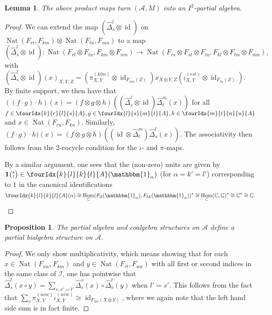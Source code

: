 \documentclass[10pt]{article}
\DeclareMathOperator{\id}{id}
\DeclareMathOperator{\Hom}{Hom}
\DeclareMathOperator{\Nat}{\mathrm{Nat}}
\newcommand{\C}{\mathbb{C}}
\newcommand{\Grt}[3]{#1{\tiny {\begin{pmatrix} #2\\#3\end{pmatrix}}}}
\newcommand{\Unitb}{\mathbbm{1}}
\newcommand{\UnitC}[2]{\Grt{\mathbf{1}}{#1}{#2}}
\newcommand{\Gr}[5]{\fourIdx{#2}{#4}{#3}{#5}{#1}}%
\newtheorem{Lem}[Theorem]{Lemma}
\newtheorem{Prop}[Theorem]{Proposition}
\theoremstyle{definition}
\numberwithin{equation}{section}
\begin{document}
\begin{Lem} The above product maps turn $(\mathscr{A},M)$ into an $I^2$-partial algebra.
\end{Lem}
\begin{proof} We can extend the map $(\hat{\Delta}^l_s\otimes \id)$ on $\Nat(F_{rt},F_{km})\otimes \Nat(F_{tu},F_{mn})$ to a map $(\hat{\Delta}^l_s\otimes \id): \Nat(F_{rt}\otimes F_{tu},F_{km}\otimes F_{mn}) \rightarrow  \Nat(F_{rs}\otimes F_{st}\otimes F_{tu},F_{kl}\otimes F_{lm}\otimes F_{mn}),$ with $(\hat{\Delta}^l_s\otimes \id)(x)_{X,Y,Z} = \left(\pi^{(klm)}_{X,Y}\otimes \id_{F_{mn}(Z)}\right) x_{X\otimes Y, Z} \left(\iota^{(rst)}_{X,Y} \otimes \id_{F_{tu}(Z)}\right).$
By finite support, we then have that $((f\cdot g)\cdot h)(x) = (f\otimes g\otimes h)((\hat{\Delta}^l_s\otimes \id)\hat{\Delta}^m_t(x))$ for all $f\in \Gr{A}{k}{l}{r}{s},g\in \Gr{A}{l}{m}{s}{t},h\in \Gr{A}{m}{n}{t}{u}$ and $x\in  \Nat(F_{ru},F_{kn})$. Similarly, $(f\cdot g)\cdot h)(x) = (f\otimes g\otimes h)((\id\otimes \hat{\Delta}^m_t)\hat{\Delta}^l_s(x)).$ The associativity then follows from the 2-cocycle condition for the $\iota$- and $\pi$-maps. 

By a similar argument, one sees that the (non-zero) units are given by $\UnitC{k}{l}\in \Gr{A}{k}{k}{l}{l}(\Unitb_{\alpha})$  (for $\alpha=k'=l'$) corresponding to $1$ in the canonical identifications  \[\Gr{A}{k}{k}{l}{l}(\alpha) \cong \Hom_{\C}(F_{ll}(\Unitb_{\alpha}),F_{kk}(\Unitb_{\alpha}))^*\cong \Hom_{\C}(\C,\C)^*  \cong \C^* \cong \C.\] 
\end{proof} 

\begin{Prop} The partial algebra and coalgebra structures on $\mathscr{A}$ define a partial bialgebra structure on $\mathscr{A}$. 
\end{Prop}
\begin{proof} We only show multiplicativity, which means showing that for each $x\in \Nat(F_{uw},F_{km})$ and $y\in \Nat(F_{rt},F_{uw})$ with all first or second indices in the same class of $\mathscr{I}$, one has pointwise that $\hat{\Delta}^l_s(x\circ y) = \sum_{v,v'=l'} \hat{\Delta}^v_s(x)\circ \hat{\Delta}^l_v(y)$ when  $l'=s'$. This follows from the fact that $\sum_v \pi^{(uvw)}_{X,Y}\iota^{(uvw)}_{X,Y} \cong \id_{F_{uw}(X\otimes Y)}$, where we again note that the left hand side sum is in fact finite.
\end{proof} 
\end{document}
